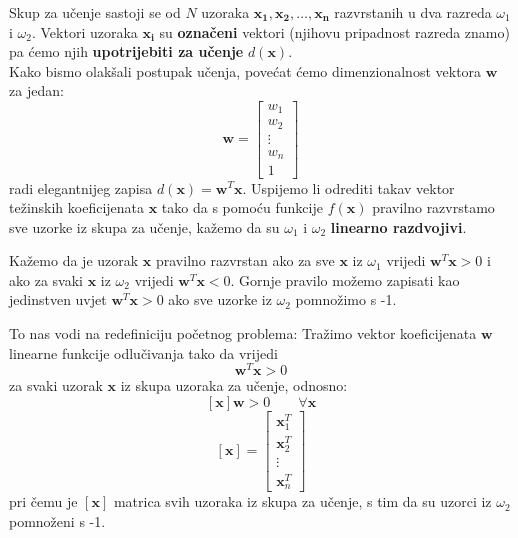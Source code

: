 \documentclass{book}
\begin{document}
Skup za učenje sastoji se od $N$ uzoraka $\mathbf{x_1}, \mathbf{x_2},\ldots,
\mathbf{x_n}$ razvrstanih u dva razreda $\omega_1$ i $\omega_2$. Vektori uzoraka
$\mathbf{x_i}$ su \textbf{označeni} vektori (njihovu pripadnost razreda znamo)
pa ćemo njih \textbf{upotrijebiti za učenje} $d(\mathbf{x})$. \\

Kako bismo olakšali postupak učenja, povećat ćemo dimenzionalnost vektora
$\mathbf{w}$ za jedan:
$$ \mathbf{w} = \begin{bmatrix}
w_1 \\
w_2 \\
\vdots \\
w_n \\
1
\end{bmatrix} $$
radi elegantnijeg zapisa $d(\mathbf{x}) = \mathbf{w}^T\mathbf{x}$. Uspijemo li
odrediti takav vektor težinskih koeficijenata $\mathbf{x}$  tako da s pomoću
funkcije $f(\mathbf{x})$ pravilno razvrstamo sve uzorke iz skupa za učenje,
kažemo da su $\omega_1$ i $\omega_2$
 \textbf{linearno razdvojivi}.

\begin{shaded}
Kažemo da je uzorak $\mathbf{x}$ pravilno razvrstan ako za sve $\mathbf{x}$ iz
$\omega_1$ vrijedi $\mathbf{w}^T\mathbf{x} > 0$ i ako za svaki $\mathbf{x}$ iz
$\omega_2$ vrijedi $\mathbf{w}^T\mathbf{x} < 0$. 
Gornje pravilo možemo zapisati kao jedinstven uvjet $\mathbf{w}^T\mathbf{x} > 0$
ako sve uzorke iz $\omega_2$ pomnožimo s -1.
\end{shaded}

To nas vodi na redefiniciju početnog problema: 
Tražimo vektor koeficijenata $\mathbf{w}$ linearne funkcije odlučivanja tako da
vrijedi $$\mathbf{w}^T\mathbf{x} > 0 $$ za svaki uzorak $\mathbf{x}$ iz skupa
uzoraka za učenje, odnosno:
$$ [\mathbf{x}]\mathbf{w} > 0 \quad \quad \forall \mathbf{x}   $$
$$ [\mathbf{x}] = \begin{bmatrix}
\mathbf{x}_1^T \\
\mathbf{x}_2^T \\
\vdots \\
\mathbf{x}_n^T
\end{bmatrix}  $$
pri čemu je $[\mathbf{x}]$ matrica svih uzoraka iz skupa za učenje, s tim da su
uzorci iz $\omega_2$ pomnoženi s -1. \\
\end{document}
